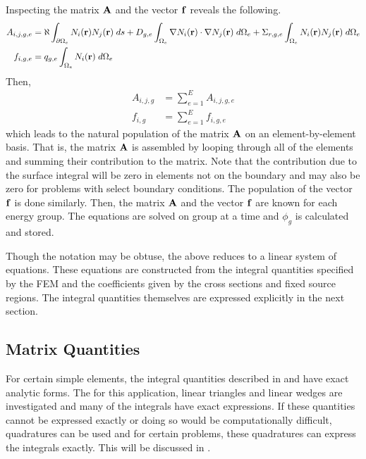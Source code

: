     Inspecting the matrix $\mathbf{A}$ and the vector $\mathbf{f}$ reveals the following.
    \begin{align}
      \label{eq:matrix_population}
      A_{i,j,g,e} &= \aleph \int_{\partial \Omega_e} N_i(\mathbf{r}) 
        N_j(\mathbf{r}) \; ds + D_{g,e} 
        \int_{\Omega_e} \mathbf{\nabla} N_i(\mathbf{r}) \cdot \mathbf{\nabla} N_j(\mathbf{r}) \;
        d\Omega_e + \Sigma_{r,g,e} \int_{\Omega_e} N_i(\mathbf{r}) N_j(\mathbf{r})
        \; d\Omega_e \\
      \label{eq:vector_population}
      f_{i,g,e} &= q_{g,e} \int_{\Omega_e} N_i(\mathbf{r}) \;d\Omega_e
    \end{align}
    Then, 
    \begin{align}
      A_{i,j,g} &= \sum_{e=1}^{E} A_{i,j,g,e} \\
      f_{i,g} &=  \sum_{e=1}^{E} f_{i,g,e}
    \end{align}
    which leads to the natural population of the matrix $\mathbf{A}$ on an 
    element-by-element basis. That is, the matrix $\mathbf{A}$ is assembled by looping
    through all of the elements and summing their contribution to the matrix. 
    Note that the contribution due to the surface integral will be zero in 
    elements not on the boundary and may also be zero for problems with select
    boundary conditions. The population of the vector $\mathbf{f}$ is done similarly. 
    Then, the matrix $\mathbf{A}$ and the vector $\mathbf{f}$ are known for each energy group.
    The equations are solved on group at a time and $\phi_g$ is calculated and 
    stored.
    
    Though the notation may be obtuse, the above reduces to a linear system of
    equations. These equations are constructed from the integral quantities 
    specified by the FEM and the coefficients given by the cross sections and
    fixed source regions. The integral quantities themselves are expressed 
    explicitly in the next section.
    
  \subsection{Matrix Quantities}
    For certain simple elements, the integral quantities described in 
     and  have exact 
    analytic forms. The for this application, linear triangles and linear wedges
    are investigated and many of the integrals have exact expressions. If these 
    quantities cannot be expressed exactly or doing so would be computationally
    difficult, quadratures can be used and for certain problems, these 
    quadratures can express the integrals exactly. This will be discussed in 
    .
